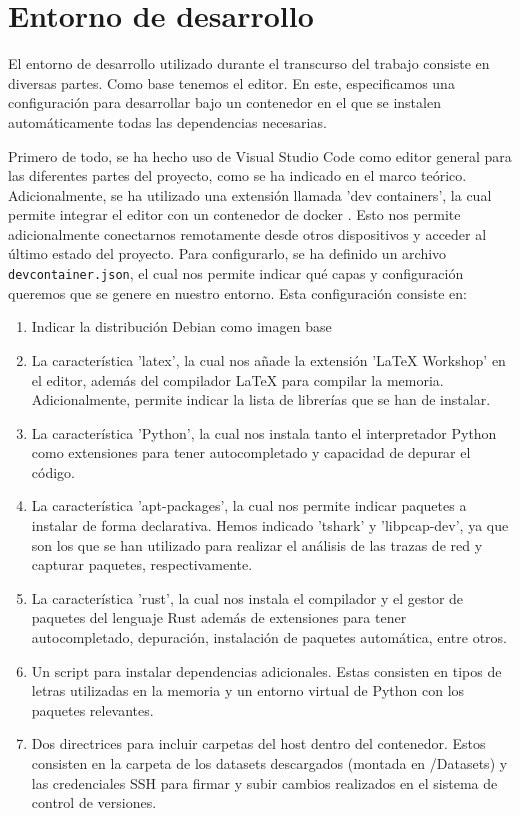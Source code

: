 \section{Entorno de desarrollo}

El entorno de desarrollo utilizado durante el transcurso del trabajo consiste en diversas partes. Como base tenemos el editor. En este, especificamos una configuración para desarrollar bajo un contenedor en el que se instalen automáticamente todas las dependencias necesarias.

Primero de todo, se ha hecho uso de Visual Studio Code como editor general para las diferentes partes del proyecto, como se ha indicado en el marco teórico. Adicionalmente, se ha utilizado una extensión llamada 'dev containers', la cual permite integrar el editor con un contenedor de docker \cite{devcontainers}. Esto nos permite adicionalmente conectarnos remotamente desde otros dispositivos y acceder al último estado del proyecto. Para configurarlo, se ha definido un archivo \texttt{devcontainer.json}, el cual nos permite indicar qué capas y configuración queremos que se genere en nuestro entorno. Esta configuración consiste en:

\begin{enumerate}
    \item Indicar la distribución Debian como imagen base
    \item La característica 'latex', la cual nos añade la extensión 'LaTeX Workshop' en el editor, además del compilador LaTeX para compilar la memoria. Adicionalmente, permite indicar la lista de librerías que se han de instalar.
    \item La característica 'Python', la cual nos instala tanto el interpretador Python como extensiones para tener autocompletado y capacidad de depurar el código.
    \item La característica 'apt-packages', la cual nos permite indicar paquetes a instalar de forma declarativa. Hemos indicado 'tshark' y 'libpcap-dev', ya que son los que se han utilizado para realizar el análisis de las trazas de red y capturar paquetes, respectivamente.
    \item La característica 'rust', la cual nos instala el compilador y el gestor de paquetes del lenguaje Rust además de extensiones para tener autocompletado, depuración, instalación de paquetes automática, entre otros.
    \item Un script para instalar dependencias adicionales. Estas consisten en tipos de letras utilizadas en la memoria y un entorno virtual de Python con los paquetes relevantes. 
    \item Dos directrices para incluir carpetas del host dentro del contenedor. Estos consisten en la carpeta de los datasets descargados (montada en /Datasets) y las credenciales SSH para firmar y subir cambios realizados en el sistema de control de versiones.
\end{enumerate}

